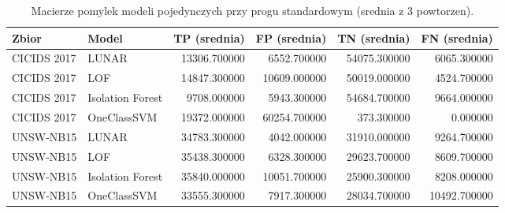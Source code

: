 \begin{table}
\caption{Macierze pomylek modeli pojedynczych przy progu standardowym (srednia z 3 powtorzen).}
\label{tab:solo_confusion_matrices}
\begin{tabular}{llrrrr}
\toprule
Zbior & Model & TP (srednia) & FP (srednia) & TN (srednia) & FN (srednia) \\
\midrule
CICIDS 2017 & LUNAR & 13306.700000 & 6552.700000 & 54075.300000 & 6065.300000 \\
CICIDS 2017 & LOF & 14847.300000 & 10609.000000 & 50019.000000 & 4524.700000 \\
CICIDS 2017 & Isolation Forest & 9708.000000 & 5943.300000 & 54684.700000 & 9664.000000 \\
CICIDS 2017 & OneClassSVM & 19372.000000 & 60254.700000 & 373.300000 & 0.000000 \\
UNSW-NB15 & LUNAR & 34783.300000 & 4042.000000 & 31910.000000 & 9264.700000 \\
UNSW-NB15 & LOF & 35438.300000 & 6328.300000 & 29623.700000 & 8609.700000 \\
UNSW-NB15 & Isolation Forest & 35840.000000 & 10051.700000 & 25900.300000 & 8208.000000 \\
UNSW-NB15 & OneClassSVM & 33555.300000 & 7917.300000 & 28034.700000 & 10492.700000 \\
\bottomrule
\end{tabular}
\end{table}
